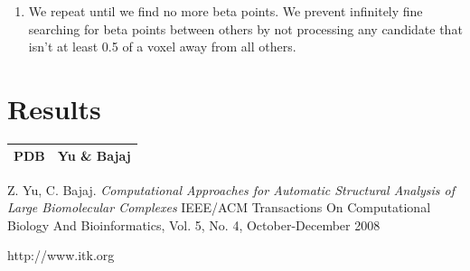 \documentclass{article}
\begin{document}
\begin{enumerate}
  \item We repeat until we find no more beta points. We prevent infinitely fine
    searching for beta points between others by not processing any candidate that
    isn't at least 0.5 of a voxel away from all others.


\end{enumerate}

\section{Results}

\begin{tabular}{|c|c|} \hline
PDB & Yu \& Bajaj \\
\hline

\end{tabular}

\begin{thebibliography}{9}
 Z. Yu, C. Bajaj. \textsl{Computational Approaches for Automatic Structural Analysis of Large Biomolecular Complexes}
IEEE/ACM Transactions On Computational Biology And Bioinformatics, Vol. 5, No. 4, October-December 2008

 http://www.itk.org

\end{thebibliography}
\end{document}
